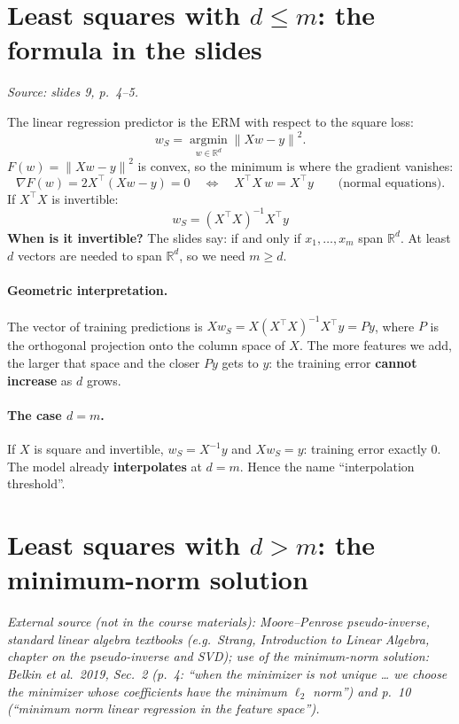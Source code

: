 \documentclass[11pt,a4paper]{article}
\newcommand{\R}{\mathbb{R}}
\newcommand{\norm}[1]{\left\lVert #1 \right\rVert}
\newcommand{\fonte}[1]{\par\noindent\textit{Source: #1}\par\smallskip}
\newcommand{\esterna}[1]{\par\noindent\textit{External source (not in the course materials): #1}\par\smallskip}
\begin{document}
\section{Least squares with $d \le m$: the formula in the slides}
\fonte{slides 9, p.~4--5.}

The linear regression predictor is the ERM with respect to the square loss:
\[
  w_S = \operatorname*{argmin}_{w \in \R^d} \norm{Xw - y}^2 .
\]
$F(w) = \norm{Xw - y}^2$ is convex, so the minimum is where the gradient vanishes:
\[
  \nabla F(w) = 2X^\top(Xw - y) = 0
  \quad\Longleftrightarrow\quad
  X^\top X\, w = X^\top y \qquad \text{(normal equations)}.
\]
If $X^\top X$ is invertible:
\[
  \boxed{w_S = (X^\top X)^{-1} X^\top y}
\]
\textbf{When is it invertible?} The slides say: if and only if $x_1,\dots,x_m$ span $\R^d$.
At least $d$ vectors are needed to span $\R^d$, so we need $m \ge d$.

\paragraph{Geometric interpretation.}
The vector of training predictions is $Xw_S = X(X^\top X)^{-1}X^\top y = Py$, where $P$ is the orthogonal projection
onto the column space of $X$. The more features we add, the larger that space and the closer $Py$ gets to $y$:
the training error \textbf{cannot increase} as $d$ grows.

\paragraph{The case $d = m$.}
If $X$ is square and invertible, $w_S = X^{-1}y$ and $Xw_S = y$: training error exactly $0$.
The model already \textbf{interpolates} at $d = m$. Hence the name ``interpolation threshold''.

\section{Least squares with $d > m$: the minimum-norm solution}
\esterna{Moore--Penrose pseudo-inverse, standard linear algebra textbooks (e.g.\ Strang, \emph{Introduction to Linear
Algebra}, chapter on the pseudo-inverse and SVD); use of the minimum-norm solution: Belkin et al.\ 2019, Sec.~2 (p.~4: ``when the minimizer is not unique \dots{} we choose the minimizer whose coefficients have the minimum $\ell_2$ norm'') and p.~10 (``minimum norm linear regression in the feature space'').}
\end{document}
